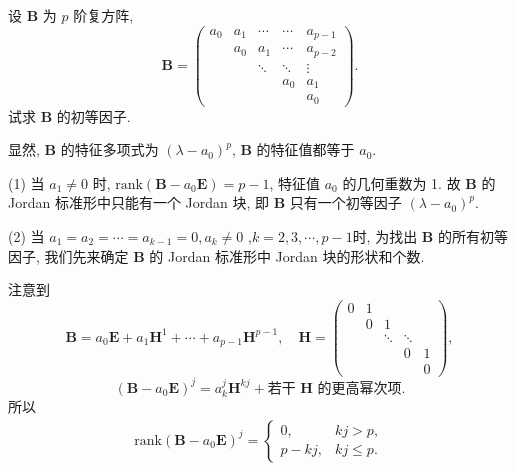 \documentclass[../../main.tex]{subfiles}%
\begin{document}
\begin{example}
设 $\boldsymbol{B}$ 为 $p$ 阶复方阵,
\[
\boldsymbol{B} = \begin{pmatrix} 
a_0 & a_1 & \cdots & \cdots & a_{p-1} \\
& a_0 & a_1 & \cdots & a_{p-2} \\
& & \ddots & \ddots & \vdots \\
& & & a_0 & a_1 \\
& & & & a_0 
\end{pmatrix}.
\]
试求 $\boldsymbol{B}$ 的初等因子.
\end{example}
\begin{solution}

显然, $\boldsymbol{B}$ 的特征多项式为 $(\lambda - a_0)^p$, $\boldsymbol{B}$ 的特征值都等于 $a_0$.

(1) 当 $a_1 \neq 0$ 时, $\mathrm{rank}(\boldsymbol{B} - a_0\boldsymbol{E}) = p - 1$, 特征值 $a_0$ 的几何重数为 1. 故 $\boldsymbol{B}$ 的 Jordan 标准形中只能有一个 Jordan 块, 即 $\boldsymbol{B}$ 只有一个初等因子 $(\lambda - a_0)^p$.

(2) 当 $a_1 = a_2 = \cdots = a_{k-1} = 0, a_k \neq 0$ ,$k=2,3,\cdots,p-1$时, 为找出 $\boldsymbol{B}$ 的所有初等因子, 我们先来确定 $\boldsymbol{B}$ 的 Jordan 标准形中 Jordan 块的形状和个数.

注意到
\[
\boldsymbol{B} = a_0\boldsymbol{E} + a_1\boldsymbol{H}^1 + \cdots + a_{p-1}\boldsymbol{H}^{p-1}, \quad \boldsymbol{H} = \begin{pmatrix} 
0 & 1 & & \\
& 0 & 1 & \\
& & \ddots & \ddots \\
& & & 0 & 1 \\
& & & & 0 
\end{pmatrix},
\]
\[
(\boldsymbol{B} - a_0\boldsymbol{E})^j = a_k^j\boldsymbol{H}^{kj} + \text{若干 } \boldsymbol{H} \text{ 的更高幂次项}.
\]
所以
\begin{align}
\mathrm{rank}(\boldsymbol{B} - a_0\boldsymbol{E})^j = \begin{cases} 
0, & kj > p, \\
p - kj, & kj \leqslant p.
\end{cases}\label{eq::::::--000002}
\end{align}


\end{solution}
\end{document}

